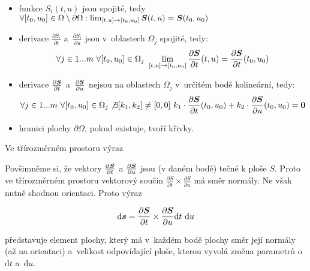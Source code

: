 \begin{itemize}
\item funkce \(S_i(t, u)\) jsou spojité, tedy \(\forall [t_0, u_0] \in \Omega \setminus \partial \Omega: \lim_{[t, u] \to [t_0, u_0]} \boldsymbol{S}(t, u) = \boldsymbol{S}(t_0, u_0)\)

\item derivace \(\frac{\partial S_i}{\partial t}\) a~\(\frac{\partial S_i}{\partial u}\) jsou v~oblastech \(\Omega_j\) spojité, tedy:
\begin{equation}
\forall j \in 1...m \ \forall [t_0, u_0] \in \Omega_j \ \lim_{[t, u] \to [t_0, u_0]} \frac{\partial \vect{S}}{\partial t}(t, u) = \frac{\partial \vect{S}}{\partial t}(t_0, u_0)
\end{equation}

\item derivace \(\frac{\partial \boldsymbol{S}}{\partial t}\) a~\(\frac{\partial \boldsymbol{S}}{\partial u}\) nejsou na oblastech \(\Omega_j\) v~určitém bodě kolineární, tedy:
\begin{equation}
\forall j \in 1...m \ \forall [t_0, u_0] \in \Omega_j \not \exists [k_1, k_2] \neq [0, 0] \ k_1 \cdot \frac{\partial \boldsymbol{S}}{\partial t}(t_0, u_0) + k_2 \cdot \frac{\partial \boldsymbol{S}}{\partial u}(t_0, u_0) = \boldsymbol{0}
\end{equation}

\item hranici plochy \(\partial \Omega\), pokud existuje, tvoří křivky.

\end{itemize}

Ve třírozměrném prostoru výraz 

Povšimněme si, že vektory \(\frac{\partial \boldsymbol{S}}{\partial t}\) a \(\frac{\partial \boldsymbol{S}}{\partial u}\) jsou (v daném bodě) tečné k ploše \(S\). Proto ve třírozměrném prostoru vektorový součin \(\frac{\partial S}{\partial t} \times \frac{\partial S}{\partial u}\) má směr normály. Ne však nutně shodnou orientaci. Proto výraz

\begin{equation}
\label{eq:element_plochy}
\mathrm{d} \vect{s} = \frac{\partial \vect{S}}{\partial t} \times \frac{\partial \vect{S}}{\partial u} \mathrm{d}t \ \mathrm{d}u
\end{equation}

představuje element plochy, který má v~každém bodě plochy směr její normály (až na orientaci) a~velikost odpovídající ploše, kterou vyvolá změna parametrů o~\(\mathrm{d}t\) a~\(\mathrm{d}u\).

